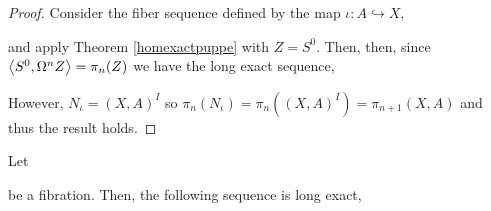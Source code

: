 \documentclass[12pt]{extarticle}
\begin{document}
\begin{proof}
Consider the fiber sequence defined by the map $\iota : A \hookrightarrow X$, 
\begin{center}
\end{center}
and apply Theorem \ref{homexactpuppe} with $Z = S^0$. Then, then, since $\left< S^0, \Omega^n Z \right> = \pi_n(Z)$ we have the long exact sequence,
\begin{center}
\end{center}
However, $N_\iota = (X, A)^I$ so $\pi_n(N_\iota) = \pi_n((X, A)^I) = \pi_{n+1}(X, A)$ and thus the result holds.
\end{proof}



\begin{theorem}
Let 
\begin{center}
\end{center}
be a fibration. Then, the following sequence is long exact,
\begin{center}
\end{center}
\end{theorem}
\end{document}
